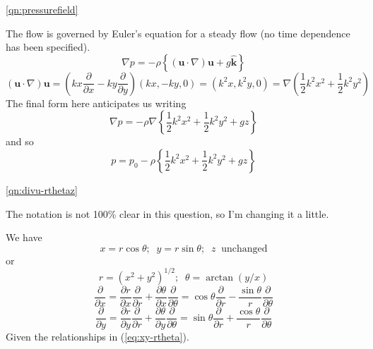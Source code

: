 \documentclass[10pt]{report}
\begin{document}
\begin{answer2}


\begin{questionnumber}{\ref{qn:pressurefield}}

The flow is governed by Euler's equation for a steady flow (no time dependence has been
specified).
\[
 \nabla p = -\rho \left\{ ({\bm u}\cdot \nabla){\bm u} + g\hat{\bm k}  \right\}
\]
\[
 ({\bm u}\cdot \nabla){\bm u} =
         \left( kx\frac{\partial}{\partial x} - ky\frac{\partial}{\partial y} \right)
         \left( {kx,-ky,0} \right)
         = \left( {k^{2}x, k^{2}y,0} \right) = \nabla\left( \frac{1}{2}k^{2}x^{2} + \frac{1}{2}k^{2}y^{2} \right)
\]
The final form here anticipates us writing
\[
\nabla p = -\rho \nabla \left\{  \frac{1}{2}k^{2}x^{2} + \frac{1}{2}k^{2}y^{2} + gz \right\}
\]
and so
\[
 p = p_{0} - \rho \left\{  \frac{1}{2}k^{2}x^{2} + \frac{1}{2}k^{2}y^{2} + gz \right\}
\]
\end{questionnumber}



\begin{questionnumber}{\ref{qn:divu-rthetaz}}

The notation is not 100\% clear in this question, so I'm changing it a little.

We have
\begin{equation}
	x = r \cos\theta; \;\; y = r \sin\theta; \;\; z \;\; \text{unchanged}
\label{eq:xy-rtheta}
\end{equation}
or
\[
    r = ( x^{2} + y^{2} )^{{1/2}}; \;\;  \theta = \arctan (y/x)
\]
\[
    \frac{\partial}{\partial x} = \frac{\partial r}{\partial x}\frac{\partial }{\partial r} +
                                  \frac{\partial \theta}{\partial x}\frac{\partial }{\partial \theta} =
                                  \cos\theta \frac{\partial }{\partial r} -
                                  \frac{\sin\theta}{r}   \frac{\partial }{\partial \theta}
\]
\[
    \frac{\partial}{\partial y} = \frac{\partial r}{\partial y}\frac{\partial }{\partial r} +
                                  \frac{\partial \theta}{\partial y}\frac{\partial }{\partial \theta} =
                                  \sin\theta \frac{\partial }{\partial r} +
                                  \frac{\cos\theta}{r}   \frac{\partial }{\partial \theta}
\]
Given the relationships in (\ref{eq:xy-rtheta}).


\end{questionnumber}
\end{answer2}
\end{document}
